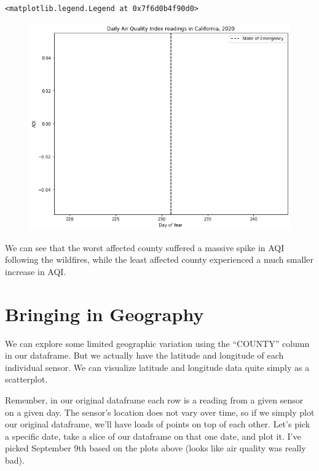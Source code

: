 \documentclass[
  letterpaper,
  DIV=11,
  numbers=noendperiod]{scrreprt}
\begin{document}
\begin{verbatim}
<matplotlib.legend.Legend at 0x7f6d0b4f90d0>
\end{verbatim}

\begin{figure}[H]

{\centering \includegraphics{notebooks/W03. Spatial Data_files/figure-pdf/cell-15-output-2.png}

}

\end{figure}

We can see that the worst affected county suffered a massive spike in
AQI following the wildfires, while the least affected county experienced
a much smaller increase in AQI.

\hypertarget{bringing-in-geography}{%
\section{Bringing in Geography}\label{bringing-in-geography}}

We can explore some limited geographic variation using the ``COUNTY''
column in our dataframe. But we actually have the latitude and longitude
of each individual sensor. We can visualize latitude and longitude data
quite simply as a scatterplot.

Remember, in our original dataframe each row is a reading from a given
sensor on a given day. The sensor's location does not vary over time, so
if we simply plot our original dataframe, we'll have loads of points on
top of each other. Let's pick a specific date, take a slice of our
dataframe on that one date, and plot it. I've picked September 9th based
on the plots above (looks like air quality was really bad).
\end{document}
